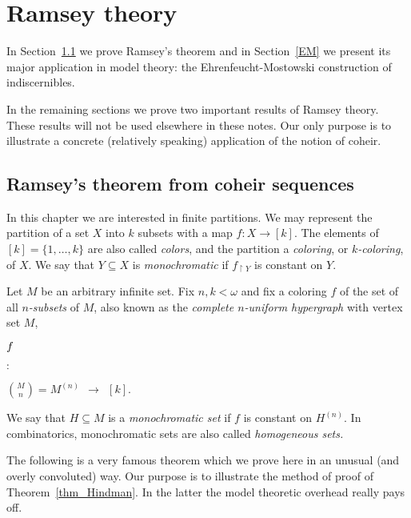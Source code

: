 \chapter{Ramsey theory}
\label{ramsey}

In Section~\ref{Ramsey} we prove Ramsey's theorem and in Section~\ref{EM} we present its major application in model theory: 
the Ehrenfeucht-Mostowski construction of indiscernibles.

In the remaining sections we prove two important results of Ramsey theory.
These results will not be used elsewhere in these notes.
Our only purpose is to illustrate a concrete (relatively speaking) application of the notion of coheir.

\def\medrel#1{\parbox[t]{6ex}{$\displaystyle\hfil #1$}}
\def\ceq#1#2#3{\parbox[t]{12ex}{$\displaystyle #1$}\medrel{#2}{$\displaystyle #3$}}

\section{Ramsey's theorem from coheir sequences}
\label{Ramsey}

In this chapter we are interested in finite partitions.
We may represent the partition of a set $X$ into $k$ subsets with a map $f:X\to [k]$.
The elements of $[k]=\{1,\dots,k\}$ are also called \emph{colors},
and the partition a \emph{coloring},
or \emph{$k$-coloring}, of $X$.
We say that $Y\subseteq X$ is \emph{monochromatic\/} if $f_{\restriction Y}$ is constant on $Y$.

Let $M$ be an arbitrary infinite set.
Fix $n,k<\omega$ and fix a coloring $f$ of the set of all \emph{$n$-subsets} of $M$,
also known as the \emph{complete $n$-uniform hypergraph\/} with vertex set $M$,

\ceq{\hfill f}{:}{ \binom{M}{n}=M^{(n)}\ \ \to\ \ [k]}.

We say that $H\subseteq M$ is a \emph{monochromatic set\/} if $f$ is constant on $H^{(n)}$.
In combinatorics, monochromatic sets are also called \emph{homogeneous sets.}

The following is a very famous theorem which we prove here in an unusual (and overly convoluted)  way.
Our purpose is to illustrate the method of proof of Theorem~\ref{thm_Hindman}.
In the latter the model theoretic overhead really pays off.

